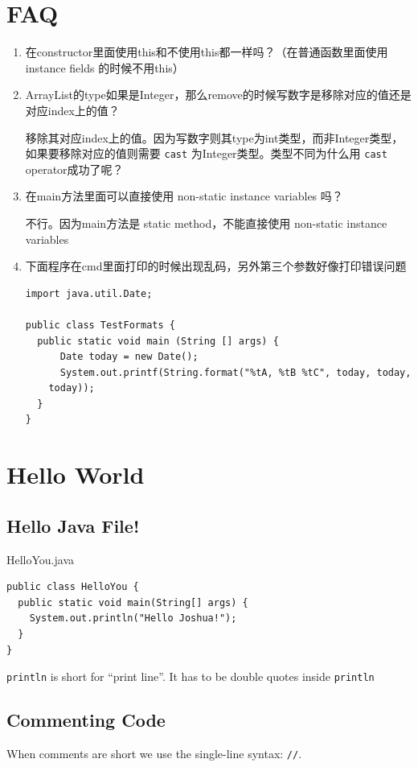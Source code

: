 \documentclass[a4paper, 12pt]{article}
\begin{document}
\section{FAQ}
\begin{enumerate}
\item 在constructor里面使用this和不使用this都一样吗？（在普通函数里面使用 instance fields 的时候不用this）

\item ArrayList的type如果是Integer，那么remove的时候写数字是移除对应的值还是对应index上的值？

移除其对应index上的值。因为写数字则其type为int类型，而非Integer类型，如果要移除对应的值则需要 \verb|cast| 为Integer类型。{\color{red}类型不同为什么用 \verb|cast| operator成功了呢？}

\item 在main方法里面可以直接使用 non-static instance variables 吗？

不行。因为main方法是 static method，不能直接使用 non-static instance variables

\item 下面程序在cmd里面打印的时候出现乱码，另外第三个参数好像打印错误问题
\begin{verbatim}
import java.util.Date;

public class TestFormats {
  public static void main (String [] args) {		
	  Date today = new Date();
	  System.out.printf(String.format("%tA, %tB %tC", today, today, 
    today));
  }
}
\end{verbatim}

\end{enumerate}


\section{Hello World}
\subsection{Hello Java File!}
HelloYou.java

\begin{verbatim}
public class HelloYou {
  public static void main(String[] args) {
    System.out.println("Hello Joshua!");
  }
}
\end{verbatim}
\verb|println| is short for ``print line''. It has to be double quotes inside \verb|println|

\subsection{Commenting Code}
When comments are short we use the single-line syntax: \verb|//|.
\end{document}
